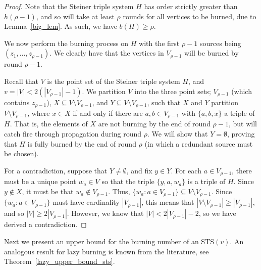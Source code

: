 \documentclass[12pt]{article}
\theoremstyle{definition}
\numberwithin{table}{section}
\newcommand{\round}{{\rho}}
\begin{document}
\begin{proof}
Note that the Steiner triple system $H$ has order strictly greater than $h(\round-1)$, and so will take at least $\round$ rounds for all vertices to be burned, due to Lemma~\ref{big_lem}. 
As such, we have $b(H) \geq \round$. 

We now perform the burning process on $H$ with the first $\rho-1$ sources being $(z_1 ,\ldots, z_{\round-1})$. We clearly have that the vertices in $V_{\round-1}$ will be burned by round $\round-1$. 

Recall that $V$ is the point set of the Steiner triple system $H$, and $v=|V| < 2(|V_{\round-1}|-1)$. We partition $V$ into the three point sets; $V_{\round-1}$ (which contains $z_{\rho-1}$), $X\subseteq V\setminus V_{\round-1}$, and $Y\subseteq V\setminus V_{\rho-1}$, such that $X$ and $Y$ partition $V\setminus V_{\rho-1}$, where $x \in X$ if and only if there are $a,b\in V_{\round-1}$ with  $\{a,b,x\}$ a triple of $H$. That is, the elements of $X$ are not burning by the end of round $\round-1$, but will catch fire through propagation during round $\round$. We will show that $Y=\emptyset$, proving that $H$ is fully burned by the end of round $\rho$ (in which a redundant source must be chosen).

For a contradiction, suppose that $Y \neq \emptyset$, and fix $y \in Y$.  For each $a \in V_{\round-1}$, there must be a unique point $w_a \in V$ so that the triple $\{y,a,w_a\}$ is a triple of $H$.  Since $y \notin X$, it must be that $w_a \notin V_{\round-1}$.  Thus, $\{w_a : a \in V_{\round-1} \} \subseteq V \setminus V_{\round-1}$. Since $\{w_a : a \in V_{\round-1} \}$ must have cardinality $|V_{\round-1}|$, this means that $|V \setminus V_{\round-1}| \geq |V_{\round-1}|$, and so $|V| \geq 2|V_{\round-1}|$.  However, we know that $|V|<2|V_{\round-1}|-2$, so we have derived a contradiction.  
\end{proof}

Next we present an upper bound for the burning number of an STS$(v)$. An analogous result for lazy burning is known from the literature, see Theorem~\ref{lazy_upper_bound_sts}.
\end{document}

